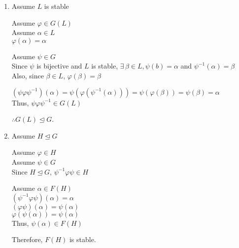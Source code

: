 \documentclass[letterpaper,12pt,fleqn]{article}
\newcommand{\p}{\varphi}
\newcommand{\s}{\psi}
\renewcommand{\a}{\alpha}
\renewcommand{\b}{\beta}
\newcommand{\n}{\trianglelefteq}
\begin{document}
\begin{theproof}
  \listbreak
  \begin{enumerate}
  \item Assume $L$ is stable

    Assume $\p\in G(L)$ \\
    Assume $\a\in L$ \\
    $\p(\a)=\a$

    Assume $\s\in G$ \\
    Since $\s$ is bijective and $L$ is stable, $\exists\,\b\in L,\s(b)=\a$ and
    $\s^{-1}(\a)=\b$ \\
    Also, since $\b\in L$, $\p(\b)=\b$

    $(\s\p\s^{-1})(\a)=\s(\p(\s^{-1}(\a)))=\s(\p(\b))=\s(\b)=\a$ \\
    Thus, $\s\p\s^{-1}\in G(L)$

    $\therefore G(L)\n G$.

  \item Assume $H\n G$

    Assume $\p\in H$ \\
    Assume $\s\in G$ \\
    Since $H\n G$, $\s^{-1}\p\s\in H$

    Assume $\a\in F(H)$ \\
    $(\s^{-1}\p\s)(\a)=\a$ \\
    $(\p\s)(\a)=\s(\a)$ \\
    $\p(\s(\a))=\s(\a)$ \\
    Thus, $\s(\a)\in F(H)$

    Therefore, $F(H)$ is stable.
  \end{enumerate}
\end{theproof}
\end{document}
